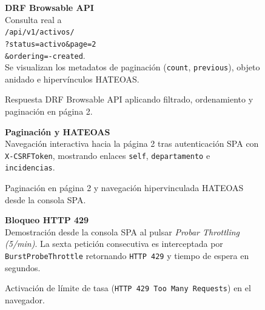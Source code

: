 \documentclass[10pt,a4paper]{article}
\begin{document}
\begin{figure}[H]
\centering
\begin{minipage}[c]{0.73\textwidth}
    \centering
\end{minipage}\hfill
\begin{minipage}[c]{0.24\textwidth}
    \raggedright
    \textbf{\color{uncpnavy}\small DRF Browsable API}\\[4pt]
    \footnotesize
    \color{uncpdark}
    Consulta real a\\
    \texttt{/api/v1/activos/}\\
    \texttt{?status=activo\&page=2}\\
    \texttt{\&ordering=-created}.\\
    Se visualizan los metadatos de paginación (\texttt{count}, \texttt{previous}), objeto anidado e hipervínculos HATEOAS.
\end{minipage}
\vspace{-0.2cm}
\caption{Respuesta DRF Browsable API aplicando filtrado, ordenamiento y paginación en página 2.}
\label{fig:interfaz_browsable}
\end{figure}

\begin{figure}[H]
\centering
\begin{minipage}[c]{0.73\textwidth}
    \centering
\end{minipage}\hfill
\begin{minipage}[c]{0.24\textwidth}
    \raggedright
    \textbf{\color{uncpnavy}\small Paginación y HATEOAS}\\[4pt]
    \footnotesize
    \color{uncpdark}
    Navegación interactiva hacia la página 2 tras autenticación SPA con \texttt{X-CSRFToken}, mostrando enlaces \texttt{self}, \texttt{departamento} e \texttt{incidencias}.
\end{minipage}
\vspace{-0.2cm}
\caption{Paginación en página 2 y navegación hipervinculada HATEOAS desde la consola SPA.}
\label{fig:interfaz_pag_hateoas}
\end{figure}

\begin{figure}[H]
\centering
\begin{minipage}[c]{0.73\textwidth}
    \centering
\end{minipage}\hfill
\begin{minipage}[c]{0.24\textwidth}
    \raggedright
    \textbf{\color{uncpnavy}\small Bloqueo HTTP 429}\\[4pt]
    \footnotesize
    \color{uncpdark}
    Demostración desde la consola SPA al pulsar \textit{Probar Throttling (5/min)}. La sexta petición consecutiva es interceptada por \texttt{BurstProbeThrottle} retornando \texttt{HTTP 429} y tiempo de espera en segundos.
\end{minipage}
\vspace{-0.2cm}
\caption{Activación de límite de tasa (\texttt{HTTP 429 Too Many Requests}) en el navegador.}
\label{fig:interfaz_429}
\end{figure}
\end{document}
